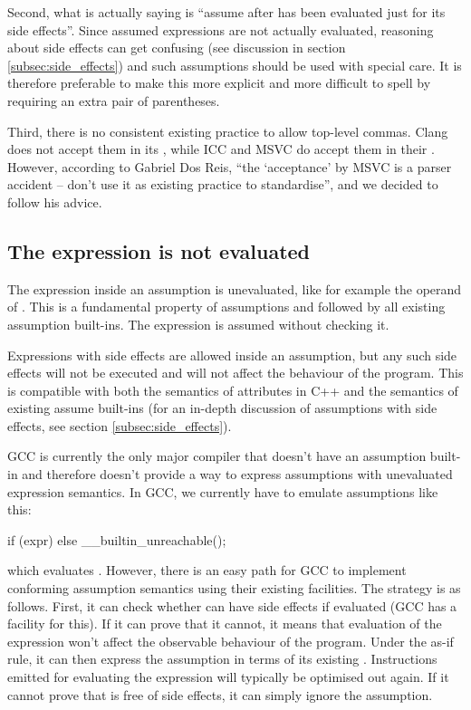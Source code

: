 Second, what  is actually saying is ``assume  after  has been evaluated just for its side effects''. Since assumed expressions are not actually evaluated, reasoning about side effects can get confusing (see discussion in section \ref{subsec:side_effects}) and such assumptions should be used with special care. It is therefore preferable to make this more explicit and more difficult to spell by requiring an extra pair of parentheses.

Third, there is no consistent existing practice to allow top-level commas. Clang does not accept them in its , while ICC and MSVC do accept them in their . However, according to Gabriel Dos Reis, ``the `acceptance' by MSVC is a parser accident -- don't use it as existing practice to standardise'', and we decided to follow his advice.

\subsection{The expression is not evaluated}

The expression inside an assumption is unevaluated, like for example the operand of . This is a fundamental property of assumptions and followed by all existing assumption built-ins. The expression is assumed without checking it.

Expressions with side effects are allowed inside an assumption, but any such side effects will not be executed and will not affect the behaviour of the program. This is compatible with both the semantics of attributes in C++ and the semantics of existing assume built-ins (for an in-depth discussion of assumptions with side effects, see section \ref{subsec:side_effects}).

GCC is currently the only major compiler that doesn't have an assumption built-in and therefore doesn't provide a way to express assumptions with unevaluated expression semantics. In GCC, we currently have to emulate assumptions like this:

\begin{codeblock}
if (expr) {} else { __builtin_unreachable(); }
\end{codeblock}

which evaluates . However, there is an easy path for GCC to implement conforming assumption semantics using their existing facilities. The strategy is as follows. First, it can check whether  can have side effects if evaluated (GCC has a facility for this). If it can prove that it cannot, it means that evaluation of the expression won't affect the observable behaviour of the program. Under the as-if rule, it can then express the assumption in terms of its existing . Instructions emitted for evaluating the expression will typically be optimised out again. If it cannot prove that  is free of side effects, it can simply ignore the assumption.

